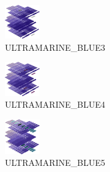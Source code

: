 \hspace{0.1cm}
\begin{minipage}[b]{0.15\linewidth}
\begin{figure}[H]                                                          
  \centering                                                             
  \begin{adjustbox}{width=1.5cm,center}                                   
  \includegraphics[width=1.5cm]{src/colorspace_colourflow/flows/colourflow_115-45.png}%
  \end{adjustbox}                                                        
\caption*{ULTRAMARINE\_BLUE3}                                           
\end{figure}                                                               
\end{minipage}
\hspace{0.1cm}
\begin{minipage}[b]{0.15\linewidth}
\begin{figure}[H]                                                          
  \centering                                                             
  \begin{adjustbox}{width=1.5cm,center}                                   
  \includegraphics[width=1.5cm]{src/colorspace_colourflow/flows/colourflow_116-45.png}%
  \end{adjustbox}                                                        
\caption*{ULTRAMARINE\_BLUE4}                                           
\end{figure}                                                               
\end{minipage}
\hspace{0.1cm}
\begin{minipage}[b]{0.15\linewidth}
\begin{figure}[H]                                                          
  \centering                                                             
  \begin{adjustbox}{width=1.5cm,center}                                   
  \includegraphics[width=1.5cm]{src/colorspace_colourflow/flows/colourflow_117-45.png}%
  \end{adjustbox}                                                        
\caption*{ULTRAMARINE\_BLUE5}                                           
\end{figure}                                                               
\end{minipage}
